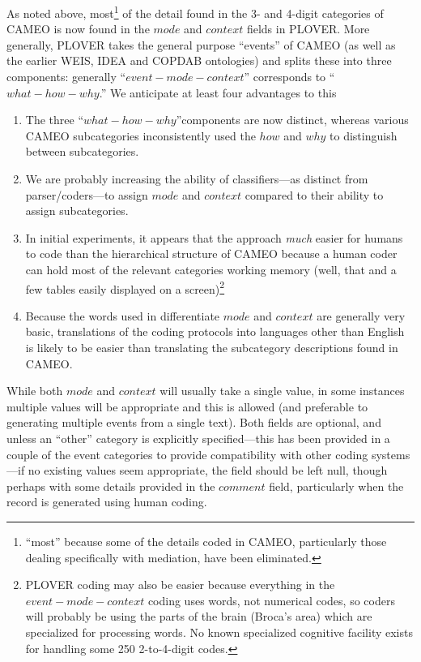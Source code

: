 \documentclass[11pt]{report}
\newcommand{\fn}[1]{\footnote{#1}}
\begin{document}
As noted above, most\fn{``most'' because some of the details coded in CAMEO, particularly those dealing specifically with mediation, have been eliminated.} of the detail found in the 3- and 4-digit categories of CAMEO is now found in the $mode$ and  $context$ fields in PLOVER. More generally, PLOVER takes the general purpose ``events'' of CAMEO (as well as the earlier WEIS, IDEA and COPDAB ontologies) and splits these into three components: generally ``$event-mode-context$'' corresponds to ``$what-how-why$.'' We anticipate at least four advantages to this
\begin{enumerate}
\item The three ``$what-how-why$''components are now distinct, whereas various CAMEO subcategories inconsistently used the $how$ and $why$ to distinguish between subcategories.
\item We are probably increasing the ability of classifiers---as distinct from parser/coders---to assign $mode$ and $context$ compared to their ability to assign subcategories.
\item In initial experiments, it appears that the  approach \textit{much} easier for humans to code than the hierarchical structure of CAMEO because a human coder can hold most of the relevant categories working memory (well, that and a few tables easily displayed on a screen)\footnote{PLOVER coding may also be easier because everything in the $event-mode-context$ coding uses words, not numerical codes, so coders will probably be using the parts of the brain (Broca's area) which are specialized for processing words. No known specialized cognitive facility exists for handling some 250 2-to-4-digit codes.}
\item Because the words used in differentiate $mode$ and $context$ are generally very basic, translations of the coding protocols into languages other than English is likely to be easier than translating the subcategory descriptions found in CAMEO. 
\end{enumerate}

While both $mode$ and $context$ will usually take a single value, in some instances multiple values will be appropriate and this is allowed (and preferable to generating multiple events from a single text). Both fields are optional, and unless an ``other'' category is explicitly specified---this has been provided in a couple of the event categories to provide compatibility with other coding systems---if no existing values seem appropriate, the field should be left null, though perhaps with some details provided in the $comment$ field, particularly when the record is generated using human coding.
\end{document}
